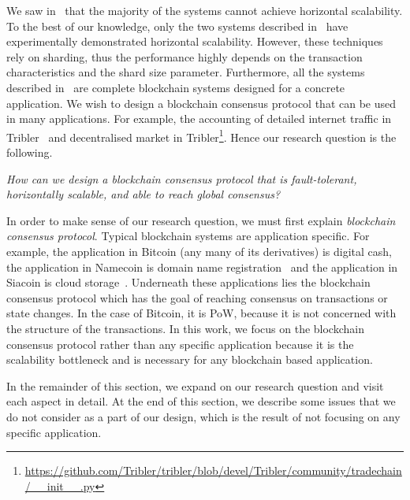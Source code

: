 We saw in~ that the majority of the systems cannot achieve horizontal scalability.
To the best of our knowledge, only the two systems described in~ have experimentally demonstrated horizontal scalability.
However, these techniques rely on sharding, thus the performance highly depends on the transaction characteristics and the shard size parameter.
Furthermore, all the systems described in~ are complete blockchain systems designed for a concrete application.
We wish to design a blockchain consensus protocol that can be used in many applications.
For example, the accounting of detailed internet traffic in Tribler~\cite{pouwelse2008tribler, multichain} and decentralised market in Tribler\footnote{\url{https://github.com/Tribler/tribler/blob/devel/Tribler/community/tradechain/__init__.py}}.
Hence our research question is the following.
\begin{displayquote}
\emph{How can we design a blockchain consensus protocol that is fault-tolerant,
horizontally scalable,
and able to reach global consensus?}
\end{displayquote}

In order to make sense of our research question, we must first explain \emph{blockchain consensus protocol}.
Typical blockchain systems are application specific.
For example, the application in Bitcoin (any many of its derivatives) is digital cash, the application in Namecoin is domain name registration~\cite{namecoin} and the application in Siacoin is cloud storage~\cite{siacoin}.
Underneath these applications lies the blockchain consensus protocol which has the goal of reaching consensus on transactions or state changes.
In the case of Bitcoin, it is PoW,
because it is not concerned with the structure of the transactions.
In this work, we focus on the blockchain consensus protocol rather than any specific application because it is the scalability bottleneck and is necessary for any blockchain based application.

In the remainder of this section, we expand on our research question and visit each aspect in detail.
At the end of this section, we describe some issues that we do not consider as a part of our design,
which is the result of not focusing on any specific application.

